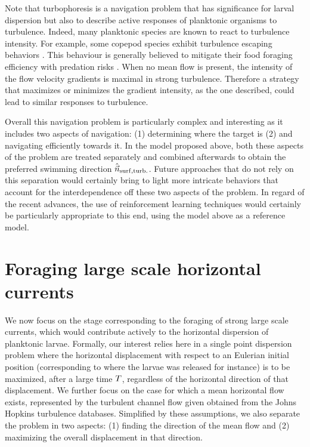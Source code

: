 Note that turbophoresis is a navigation problem that has significance for larval dispersion but also to describe active responses of planktonic organisms to turbulence.
Indeed, many planktonic species are known to react to turbulence intensity.
For example, some copepod species exhibit turbulence escaping behaviors \citep{visser2001observations, schmitt2011direct}.
This behaviour is generally believed to mitigate their food foraging efficiency with predation risks \citep{visser2009swimming}.
When no mean flow is present, the intensity of the flow velocity gradients is maximal in strong turbulence.
Therefore a strategy that maximizes or minimizes the gradient intensity, as the one described, could lead to similar responses to turbulence.

Overall this navigation problem is particularly complex and interesting as it includes two aspects of navigation: (1) determining where the target is (2) and navigating efficiently towards it.
In the model proposed above, both these aspects of the problem are treated separately and combined afterwards to obtain the preferred swimming direction $\hat{\vec{n}}_{\mathrm{surf}, \mathrm{turb.}}$.
Future approaches that do not rely on this separation would certainly bring to light more intricate behaviors that account for the interdependence off these two aspects of the problem.
In regard of the recent advances, the use of reinforcement learning techniques would certainly be particularly appropriate to this end, using the model above as a reference model.

\section{Foraging large scale horizontal currents}

We now focus on the stage corresponding to the foraging of strong large scale currents, which would contribute actively to the horizontal dispersion of planktonic larvae.
Formally, our interest relies here in a single point dispersion problem where the horizontal displacement with respect to an Eulerian initial position (corresponding to where the larvae was released for instance) is to be maximized, after a large time $T$, regardless of the horizontal direction of that displacement.
We further focus on the case for which a mean horizontal flow exists, represented by the turbulent channel flow given obtained from the Johns Hopkins turbulence databases. 
Simplified by these assumptions, we also separate the problem in two aspects: (1) finding the direction of the mean flow and (2) maximizing the overall displacement in that direction.

